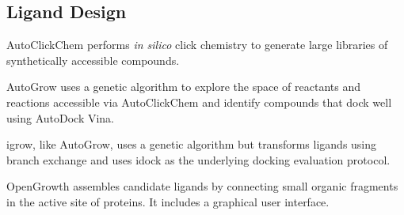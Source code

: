\subsection*{Ligand Design}

AutoClickChem \cite{Durrant_2012} performs \textit{in silico} click chemistry to generate large libraries of synthetically accessible compounds.

AutoGrow \cite{Durrant_2013} uses a genetic algorithm to explore the space of reactants and reactions accessible via AutoClickChem and identify compounds that dock well using AutoDock Vina.

igrow, like AutoGrow, uses a genetic algorithm but transforms ligands using branch exchange and uses idock as the underlying docking evaluation protocol.

OpenGrowth  \cite{Ch_ron_2015}  assembles candidate ligands by connecting small organic fragments in the active site of proteins.  It includes a graphical user interface.

